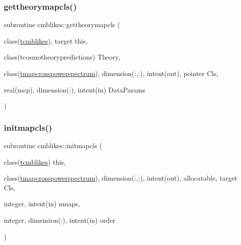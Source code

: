 \subsubsection{\texorpdfstring{gettheorymapcls()}{gettheorymapcls()}}
{\footnotesize\ttfamily subroutine cmblikes\+::gettheorymapcls (\begin{DoxyParamCaption}\item[{class(\mbox{\hyperlink{structcmblikes_1_1tcmblikes}{tcmblikes}}), target}]{this,  }\item[{class(tcosmotheorypredictions)}]{Theory,  }\item[{class(\mbox{\hyperlink{structcmblikes_1_1tmapcrosspowerspectrum}{tmapcrosspowerspectrum}}), dimension(\+:,\+:), intent(out), pointer}]{Cls,  }\item[{real(mcp), dimension(\+:), intent(in)}]{Data\+Params }\end{DoxyParamCaption})\hspace{0.3cm}{\ttfamily [private]}}

\mbox{\label{namespacecmblikes_a324d03e811c50f8dcc382819daa2adac}} 
\subsubsection{\texorpdfstring{initmapcls()}{initmapcls()}}
{\footnotesize\ttfamily subroutine cmblikes\+::initmapcls (\begin{DoxyParamCaption}\item[{class(\mbox{\hyperlink{structcmblikes_1_1tcmblikes}{tcmblikes}})}]{this,  }\item[{class(\mbox{\hyperlink{structcmblikes_1_1tmapcrosspowerspectrum}{tmapcrosspowerspectrum}}), dimension(\+:,\+:), intent(out), allocatable, target}]{Cls,  }\item[{integer, intent(in)}]{nmaps,  }\item[{integer, dimension(\+:), intent(in)}]{order }\end{DoxyParamCaption})\hspace{0.3cm}{\ttfamily [private]}}

\mbox{\label{namespacecmblikes_a160df8f7d35a11fb589fee16adc7675b}} 
